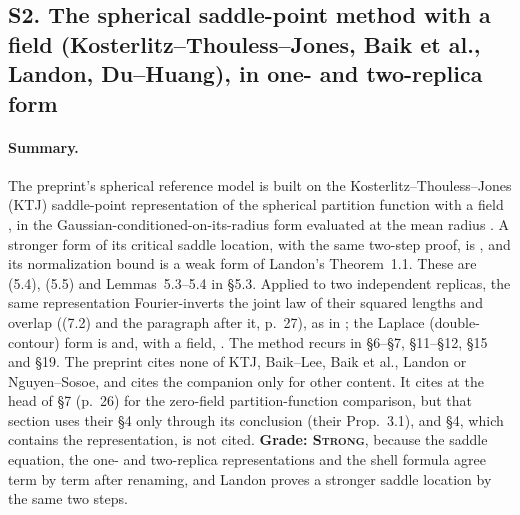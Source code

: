 \documentclass[11pt]{article}
\newcommand{\ploc}[2]{#1}
\newcommand{\sloc}[2]{\cite[#2]{#1}}
\newcommand{\grade}[1]{\textsc{#1}}
\begin{document}
\subsection{S2. The spherical saddle-point method with a field (Kosterlitz--Thouless--Jones, Baik et al., Landon, Du--Huang), in one- and two-replica form}\label{f:S2}

\paragraph{Summary.}
The preprint's spherical reference model is built on the
Kosterlitz--Thouless--Jones (KTJ) saddle-point representation of the
spherical partition function with a field
\sloc{BaikEtAl2020-SphericalSpinGlassExternalField}{Lemma~3.1}, in the
Gaussian-conditioned-on-its-radius form evaluated at the mean radius
\sloc{DuHuang2026-CriticalSKFreeEnergyFluctuations}{proof of Prop.~4.4}.
A stronger form of its critical saddle location, with the same two-step
proof, is \sloc{Landon2020-CriticalSphericalSKFreeEnergy}{Prop.~3.1 and Lemma~3.4},
and its normalization bound is a weak form of Landon's Theorem~1.1. These are
\ploc{(5.4), (5.5) and Lemmas~5.3--5.4 in \S5.3}{profile-spectral.tex:364--656}.
Applied to two independent replicas, the same representation
Fourier-inverts the joint law of their squared lengths and overlap
\ploc{((7.2) and the paragraph after it, p.~27)}{profile-spectral.tex:1182--1213},
as in \sloc{DuHuang2026-CriticalSKFreeEnergyFluctuations}{Lemma~4.3; proof of Prop.~4.5};
the Laplace (double-contour) form is
\sloc{NguyenSosoe2018-OverlapCLTNearCriticalSphericalSK}{Lemma~4} and, with
a field, \sloc{BaikEtAl2020-SphericalSpinGlassExternalField}{Lemma~3.3}.
The method recurs in \S6--\S7, \S11--\S12, \S15 and \S19. The
preprint cites none of KTJ, Baik--Lee, Baik et al., Landon or
Nguyen--Sosoe, and cites the companion \cite{OAI-AcceptedCritical} only for
other content. It cites
\sloc{DuHuang2026-CriticalSKFreeEnergyFluctuations}{Thm.~1.6 and \S3.3}
\ploc{at the head of \S7 (p.~26)}{profile-spectral.tex:1133--1135} for the
zero-field partition-function comparison, but that section uses their \S4
only through its conclusion (their Prop.~3.1), and \S4, which contains the
representation, is not cited.
\textbf{Grade: \grade{Strong}}, because the saddle equation, the one- and
two-replica representations and the shell formula agree term by term after
renaming, and Landon proves a stronger saddle location by the same two
steps.
\end{document}
